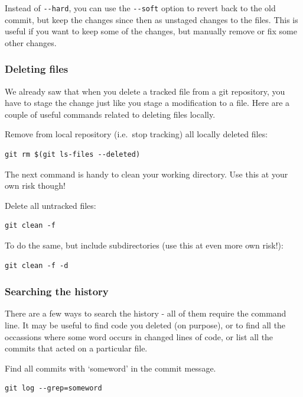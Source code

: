 \documentclass[]{book}
\begin{document}
Instead of \texttt{-\/-hard}, you can use the \texttt{-\/-soft} option to revert back to the old commit, but keep the changes since then as unstaged changes to the files. This is useful if you want to keep some of the changes, but manually remove or fix some other changes.

\hypertarget{deleting-files}{%
\subsubsection{Deleting files}\label{deleting-files}}

We already saw that when you delete a tracked file from a git repository, you have to stage the change just like you stage a modification to a file. Here are a couple of useful commands related to deleting files locally.

Remove from local repository (i.e.~stop tracking) all locally deleted files:

\begin{verbatim}
git rm $(git ls-files --deleted)
\end{verbatim}

The next command is handy to clean your working directory. Use this at your own risk though!

Delete all untracked files:

\begin{verbatim}
git clean -f
\end{verbatim}

To do the same, but include subdirectories (use this at even more own risk!):

\begin{verbatim}
git clean -f -d
\end{verbatim}

\hypertarget{searching-the-history}{%
\subsubsection{Searching the history}\label{searching-the-history}}

There are a few ways to search the history - all of them require the command line. It may be useful to find code you deleted (on purpose), or to find all the occassions where some word occurs in changed lines of code, or list all the commits that acted on a particular file.

Find all commits with `someword' in the commit message.

\begin{verbatim}
git log --grep=someword
\end{verbatim}
\end{document}
